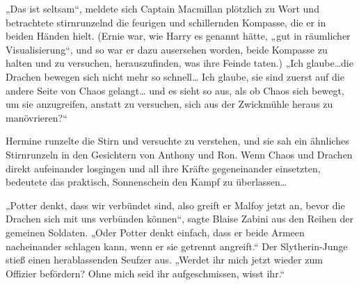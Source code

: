 „Das ist seltsam“, meldete sich Captain Macmillan plötzlich zu Wort und betrachtete stirnrunzelnd die feurigen und schillernden Kompasse, die er in beiden Händen hielt. (Ernie war, wie Harry es genannt hätte, „gut in räumlicher Visualisierung“, und so war er dazu ausersehen worden, beide Kompasse zu halten und zu versuchen, herauszufinden, was ihre Feinde taten.) „Ich glaube…die Drachen bewegen sich nicht mehr so schnell… Ich glaube, sie sind zuerst auf die andere Seite von Chaos gelangt… und es sieht so aus, als ob Chaos sich bewegt, um sie anzugreifen, anstatt zu versuchen, sich aus der Zwickmühle heraus zu manövrieren?“

Hermine runzelte die Stirn und versuchte zu verstehen, und sie sah ein ähnliches Stirnrunzeln in den Gesichtern von Anthony und Ron. Wenn Chaos und Drachen direkt aufeinander losgingen und all ihre Kräfte gegeneinander einsetzten, bedeutete das praktisch, Sonnenschein den Kampf zu überlassen…

„Potter denkt, dass wir verbündet sind, also greift er Malfoy jetzt an, bevor die Drachen sich mit uns verbünden können“, sagte Blaise Zabini aus den Reihen der gemeinen Soldaten. „Oder Potter denkt einfach, dass er beide Armeen nacheinander schlagen kann, wenn er sie getrennt angreift.“ Der Slytherin-Junge stieß einen herablassenden Seufzer aus. „Werdet ihr mich jetzt wieder zum Offizier befördern? Ohne mich seid ihr aufgeschmissen, wisst ihr.“

